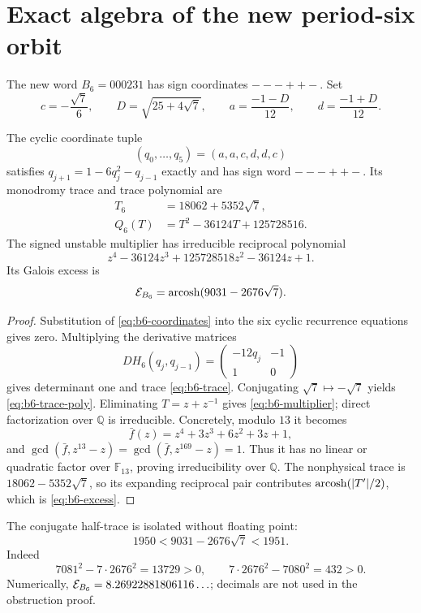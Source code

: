 \section{Exact algebra of the new period-six orbit}

The new word \(B_6=000231\) has sign coordinates \(---++-\).  Set
\begin{equation}\label{eq:b6-coordinates}
 c=-\frac{\sqrt7}{6},\qquad
 D=\sqrt{25+4\sqrt7},\qquad
 a=\frac{-1-D}{12},\qquad d=\frac{-1+D}{12}.
\end{equation}

\begin{proposition}\label{prop:b6}
The cyclic coordinate tuple
\[
 (q_0,\ldots,q_5)=(a,a,c,d,d,c)
\]
satisfies
\(q_{j+1}=1-6q_j^2-q_{j-1}\) exactly and has sign word \(---++-\).
Its monodromy trace and trace polynomial are
\begin{align}
 T_6&=18062+5352\sqrt7,\label{eq:b6-trace}\\
 Q_6(T)&=T^2-36124T+125728516.\label{eq:b6-trace-poly}
\end{align}
The signed unstable multiplier has irreducible reciprocal polynomial
\begin{equation}\label{eq:b6-multiplier}
 z^4-36124z^3+125728518z^2-36124z+1.
\end{equation}
Its Galois excess is
\begin{equation}\label{eq:b6-excess}
 \mathcal E_{B_6}=\operatorname{arcosh}(9031-2676\sqrt7).
\end{equation}
\end{proposition}

\begin{proof}
Substitution of \eqref{eq:b6-coordinates} into the six cyclic recurrence
equations gives zero.  Multiplying the derivative matrices
\[
 DH_6(q_j,q_{j-1})=\begin{pmatrix}-12q_j&-1\\1&0\end{pmatrix}
\]
gives determinant one and trace \eqref{eq:b6-trace}.  Conjugating
\(\sqrt7\mapsto-\sqrt7\) yields \eqref{eq:b6-trace-poly}.  Eliminating
\(T=z+z^{-1}\) gives \eqref{eq:b6-multiplier}; direct factorization over
\(\mathbb Q\) is irreducible.  Concretely, modulo \(13\) it becomes
\[
 \bar f(z)=z^4+3z^3+6z^2+3z+1,
\]
and
\(\gcd(\bar f,z^{13}-z)=\gcd(\bar f,z^{169}-z)=1\).
Thus it has no linear or quadratic factor over \(\mathbb F_{13}\), proving
irreducibility over \(\mathbb Q\).  The nonphysical trace is
\(18062-5352\sqrt7\), so its expanding reciprocal pair contributes
\(\operatorname{arcosh}(|T'|/2)\), which is \eqref{eq:b6-excess}.
\end{proof}

The conjugate half-trace is isolated without floating point:
\begin{equation}\label{eq:b6-isolation}
 1950<9031-2676\sqrt7<1951.
\end{equation}
Indeed
\[
 7081^2-7\cdot2676^2=13729>0,
 \qquad
 7\cdot2676^2-7080^2=432>0.
\]
Numerically, \(\mathcal E_{B_6}=8.26922881806116\ldots\); decimals are not used
in the obstruction proof.
